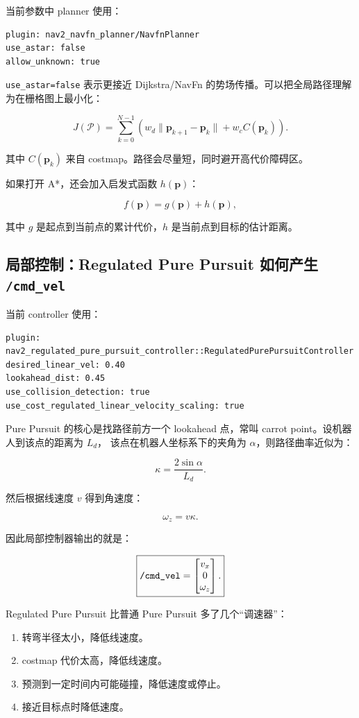 \documentclass[UTF8,11pt,a4paper]{ctexart}
\newcommand{\bs}[1]{\bm{#1}}
\begin{document}
当前参数中 planner 使用：

\begin{verbatim}
plugin: nav2_navfn_planner/NavfnPlanner
use_astar: false
allow_unknown: true
\end{verbatim}

\texttt{use\_astar=false} 表示更接近 Dijkstra/NavFn 的势场传播。可以把全局路径理解为在栅格图上最小化：

\[
\boxed{
J(\mathcal P)
=
\sum_{k=0}^{N-1}
\left(
w_d\|\bs p_{k+1}-\bs p_k\|
+
w_c C(\bs p_k)
\right).
}
\]

其中 \(C(\bs p_k)\) 来自 costmap。路径会尽量短，同时避开高代价障碍区。

如果打开 A*，还会加入启发式函数 \(h(\bs p)\)：

\[
f(\bs p)=g(\bs p)+h(\bs p),
\]

其中 \(g\) 是起点到当前点的累计代价，\(h\) 是当前点到目标的估计距离。

\subsection{局部控制：Regulated Pure Pursuit 如何产生 \texttt{/cmd\_vel}}

当前 controller 使用：

\begin{verbatim}
plugin: nav2_regulated_pure_pursuit_controller::RegulatedPurePursuitController
desired_linear_vel: 0.40
lookahead_dist: 0.45
use_collision_detection: true
use_cost_regulated_linear_velocity_scaling: true
\end{verbatim}

Pure Pursuit 的核心是找路径前方一个 lookahead 点，常叫 carrot point。设机器人到该点的距离为 \(L_d\)，
该点在机器人坐标系下的夹角为 \(\alpha\)，则路径曲率近似为：

\[
\boxed{
\kappa
=
\frac{2\sin\alpha}{L_d}.
}
\]

然后根据线速度 \(v\) 得到角速度：

\[
\boxed{
\omega_z
=
v\kappa.
}
\]

因此局部控制器输出的就是：

\[
\boxed{
\text{\texttt{/cmd\_vel}}
=
\begin{bmatrix}
v_x\\
0\\
\omega_z
\end{bmatrix}.
}
\]

Regulated Pure Pursuit 比普通 Pure Pursuit 多了几个“调速器”：

\begin{enumerate}
  \item 转弯半径太小，降低线速度。
  \item costmap 代价太高，降低线速度。
  \item 预测到一定时间内可能碰撞，降低速度或停止。
  \item 接近目标点时降低速度。
\end{enumerate}
\end{document}
